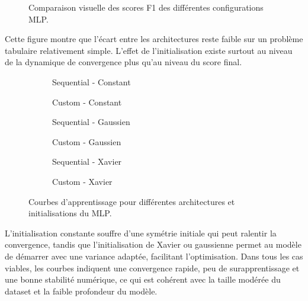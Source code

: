 \begin{figure}[H]
    \centering
    \caption{Comparaison visuelle des scores F1 des différentes configurations MLP.}
\end{figure}
Cette figure montre que l’écart entre les architectures reste faible sur un problème tabulaire relativement simple. L’effet de l’initialisation existe surtout au niveau de la dynamique de convergence plus qu’au niveau du score final.

\begin{figure}[H]
    \centering
    \begin{subfigure}[b]{0.48\textwidth}
        \caption{Sequential - Constant}
    \end{subfigure}
    \hfill
    \begin{subfigure}[b]{0.48\textwidth}
        \caption{Custom - Constant}
    \end{subfigure}
    
    \begin{subfigure}[b]{0.48\textwidth}
        \caption{Sequential - Gaussien}
    \end{subfigure}
    \hfill
    \begin{subfigure}[b]{0.48\textwidth}
        \caption{Custom - Gaussien}
    \end{subfigure}
    
    \begin{subfigure}[b]{0.48\textwidth}
        \caption{Sequential - Xavier}
    \end{subfigure}
    \hfill
    \begin{subfigure}[b]{0.48\textwidth}
        \caption{Custom - Xavier}
    \end{subfigure}
    
    \caption{Courbes d'apprentissage pour différentes architectures et initialisations du MLP.}
\end{figure}
L'initialisation constante souffre d'une symétrie initiale qui peut ralentir la convergence, tandis que l'initialisation de Xavier ou gaussienne permet au modèle de démarrer avec une variance adaptée, facilitant l'optimisation. Dans tous les cas viables, les courbes indiquent une convergence rapide, peu de surapprentissage et une bonne stabilité numérique, ce qui est cohérent avec la taille modérée du dataset et la faible profondeur du modèle.

